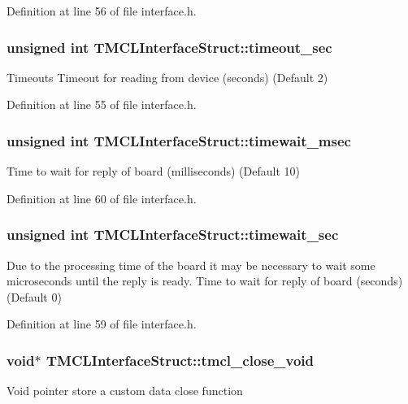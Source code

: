 Definition at line 56 of file interface.h.\hypertarget{structTMCLInterfaceStruct_a6fc25e45d20014501e64c14eb05faadf}{
\subsubsection[{timeout\_\-sec}]{\setlength{\rightskip}{0pt plus 5cm}unsigned int {\bf TMCLInterfaceStruct::timeout\_\-sec}}}
\label{structTMCLInterfaceStruct_a6fc25e45d20014501e64c14eb05faadf}
Timeouts Timeout for reading from device (seconds) (Default 2) 

Definition at line 55 of file interface.h.\hypertarget{structTMCLInterfaceStruct_abb8e42924a82e082614dee2768229736}{
\subsubsection[{timewait\_\-msec}]{\setlength{\rightskip}{0pt plus 5cm}unsigned int {\bf TMCLInterfaceStruct::timewait\_\-msec}}}
\label{structTMCLInterfaceStruct_abb8e42924a82e082614dee2768229736}
Time to wait for reply of board (milliseconds) (Default 10) 

Definition at line 60 of file interface.h.\hypertarget{structTMCLInterfaceStruct_a145d56a20944085a1447ca7b58cbfbee}{
\subsubsection[{timewait\_\-sec}]{\setlength{\rightskip}{0pt plus 5cm}unsigned int {\bf TMCLInterfaceStruct::timewait\_\-sec}}}
\label{structTMCLInterfaceStruct_a145d56a20944085a1447ca7b58cbfbee}
Due to the processing time of the board it may be necessary to wait some microseconds until the reply is ready. Time to wait for reply of board (seconds) (Default 0) 

Definition at line 59 of file interface.h.\hypertarget{structTMCLInterfaceStruct_a0bb104a6c9e2e8adb097ed7261b008ad}{
\subsubsection[{tmcl\_\-close\_\-void}]{\setlength{\rightskip}{0pt plus 5cm}void$\ast$ {\bf TMCLInterfaceStruct::tmcl\_\-close\_\-void}}}
\label{structTMCLInterfaceStruct_a0bb104a6c9e2e8adb097ed7261b008ad}
Void pointer store a custom data close function 

